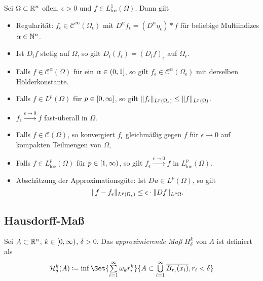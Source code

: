 \documentclass{cheat-sheet}
\newcommand{\HM}{\mathcal{H}} %
\begin{document}
\begin{satz}
  Sei $\Omega \subset \mathbb{R}^n$ offen, $\epsilon > 0$ und $f \in L_{\text{loc}}^1(\Omega)$. Dann gilt
  \begin{itemize}
    \item Regularität: $f_{\epsilon} \in \mathcal{C}^\infty(\Omega_\epsilon)$ mit $D^{\alpha} f_\epsilon = (D^\alpha \eta_\epsilon) * f$ für beliebige Multiindizes $\alpha \in \mathbb{N}^n$.
    \item Ist $D_i f$ stetig auf $\Omega$, so gilt $D_i (f_\epsilon) = (D_i f)_\epsilon$ auf $\Omega_\epsilon$. %
    \item Falls $f \in \mathcal{C}^\alpha(\Omega)$ für ein $\alpha \in \left( 0, 1 \right]$, so gilt $f_\epsilon \in \mathcal{C}^\alpha(\Omega_\epsilon)$ mit derselben Hölderkonstante.
    \item Falls $f \in L^p(\Omega)$ für $p \in \left[ 0, \infty \right]$, so gilt $\lVert f_\epsilon\rVert_{L^p(\Omega_\epsilon)} \leq \lVert f\rVert_{L^p(\Omega)}$.
    \item $f_\epsilon \xrightarrow{\epsilon \to 0} f$ fast-überall in $\Omega$.
    \item Falls $f \in \mathcal{C}(\Omega)$, so konvergiert $f_\epsilon$ gleichmäßig gegen $f$ für $\epsilon \to 0$ auf kompakten Teilmengen von $\Omega$,
    \item Falls $f \in L_{\text{loc}}^p(\Omega)$ für $p \in \left[ 1, \infty \right)$, so gilt $f_\epsilon \xrightarrow{\epsilon \to 0} f$ in $L_{\text{loc}}^p(\Omega)$.
    \item Abschätzung der Approximationsgüte: Ist $Du \in L^p(\Omega)$, so gilt
    \[ \lVert f - f_\epsilon\rVert_{L^p(\Omega_\epsilon)} \leq \epsilon \cdot \lVert Df\rVert_{L^p{\Omega}}. \]
  \end{itemize}
\end{satz}


\subsection{Hausdorff-Maß}

\begin{defn}
  Sei $A \subset \mathbb{R}^n$, $k \in \left[ 0, \infty \right)$, $\delta > 0$. Das \emph{approximierende Maß} $H_\delta^k$ von $A$ ist definiert als
  \[
    \HM_\delta^k(A) \coloneqq \inf \Set{ \sum_{i=1}^\infty \omega_k r_i^k }{ A \subset \bigcup_{i=1}^\infty \overline{B_{r_i}(x_i)}, r_i < \delta }
  \]
\end{defn}
\end{document}
